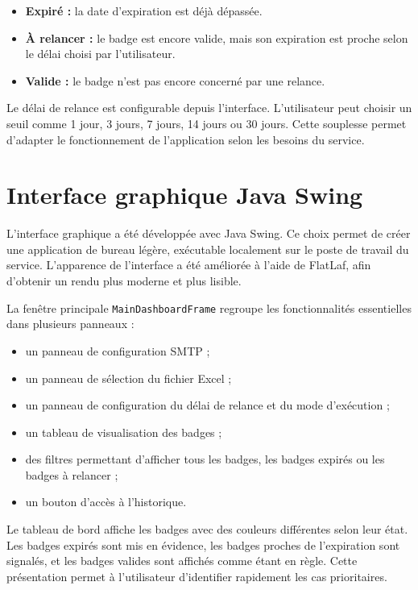 \documentclass[12pt,a4paper,openany]{report}
\begin{document}
\begin{itemize}
    \item \textbf{Expiré :} la date d'expiration est déjà dépassée.
    \item \textbf{À relancer :} le badge est encore valide, mais son expiration
    est proche selon le délai choisi par l'utilisateur.
    \item \textbf{Valide :} le badge n'est pas encore concerné par une relance.
\end{itemize}

Le délai de relance est configurable depuis l'interface. L'utilisateur peut
choisir un seuil comme 1 jour, 3 jours, 7 jours, 14 jours ou 30 jours. Cette
souplesse permet d'adapter le fonctionnement de l'application selon les besoins
du service.

\section{Interface graphique Java Swing}

L'interface graphique a été développée avec Java Swing. Ce choix permet de créer
une application de bureau légère, exécutable localement sur le poste de travail
du service. L'apparence de l'interface a été améliorée à l'aide de FlatLaf, afin
d'obtenir un rendu plus moderne et plus lisible.

La fenêtre principale \texttt{MainDashboardFrame} regroupe les fonctionnalités
essentielles dans plusieurs panneaux :

\begin{itemize}
    \item un panneau de configuration SMTP ;
    \item un panneau de sélection du fichier Excel ;
    \item un panneau de configuration du délai de relance et du mode d'exécution ;
    \item un tableau de visualisation des badges ;
    \item des filtres permettant d'afficher tous les badges, les badges expirés
    ou les badges à relancer ;
    \item un bouton d'accès à l'historique.
\end{itemize}

Le tableau de bord affiche les badges avec des couleurs différentes selon leur
état. Les badges expirés sont mis en évidence, les badges proches de l'expiration
sont signalés, et les badges valides sont affichés comme étant en règle. Cette
présentation permet à l'utilisateur d'identifier rapidement les cas prioritaires.
\end{document}
